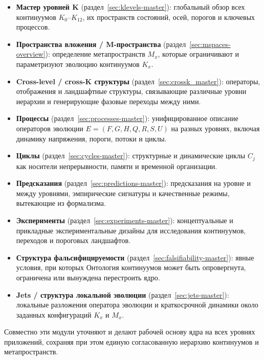 \begin{itemize}
\item \textbf{Мастер уровней K} (раздел~\ref{sec:klevels-master}):
  глобальный обзор всех континуумов \(K_0\)–\(K_{12}\), их пространств
  состояний, осей, порогов и ключевых процессов.

\item \textbf{Пространства вложения / M-пространства}
  (раздел~\ref{sec:mspaces-overview}):
  определение метапространств \(M_x\), которые ограничивают и параметризуют
  эволюцию континуумов \(K_x\).

\item \textbf{Cross-level / cross-K структуры} (раздел~\ref{sec:crossk_master}):
  операторы, отображения и ландшафтные структуры, связывающие различные
  уровни иерархии и генерирующие фазовые переходы между ними.

\item \textbf{Процессы} (раздел~\ref{sec:processes-master}):
  унифицированное описание операторов эволюции
  \(E = (F,G,H,Q,R,S,U)\) на разных уровнях, включая динамику напряжения,
  пороги, потоки и циклы.

\item \textbf{Циклы} (раздел~\ref{sec:cycles-master}):
  структурные и динамические циклы \(C_j\) как носители непрерывности,
  памяти и временной организации.

\item \textbf{Предсказания} (раздел~\ref{sec:predictions-master}):
  предсказания на уровне и между уровнями, эмпирические сигнатуры и
  качественные режимы, вытекающие из формализма.

\item \textbf{Эксперименты} (раздел~\ref{sec:experiments-master}):
  концептуальные и прикладные экспериментальные дизайны для исследования
  континуумов, переходов и пороговых ландшафтов.

\item \textbf{Структура фальсифицируемости} (раздел~\ref{sec:falsifiability-master}):
  явные условия, при которых Онтология континуумов может быть опровергнута,
  ограничена или вынуждена перестроить ядро.

\item \textbf{Jets / структура локальной эволюции} (раздел~\ref{sec:jets-master}):
  локальные разложения оператора эволюции и краткосрочной динамики
  около заданных конфигураций \(K_x\) и \(M_x\).
\end{itemize}

Совместно эти модули уточняют и делают рабочей основу ядра на всех уровнях
приложений, сохраняя при этом единую согласованную иерархию континуумов и
метапространств.
